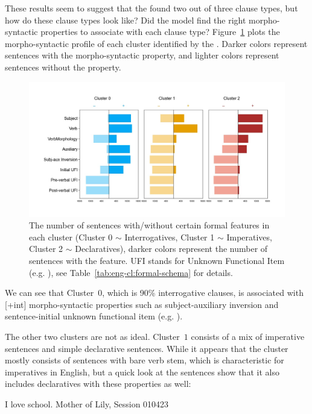 These results seem to suggest that the \dlearnerabbr{} found two out of three clause types, but how do these clause types look like? Did the model find the right morpho-syntactic properties to associate with each clause type? Figure~\ref{fig:baseline-syncluster} plots the morpho-syntactic profile of each cluster identified by the \dlearnerabbr{}. Darker colors represent sentences with the morpho-syntactic property, and lighter colors represent sentences without the property. 

\begin{figure}[H]
    \centering
    \includegraphics[width=1\textwidth]{figures/baseline-syncluster.jpg}
    \caption{The number of sentences with/without certain formal features in each cluster (Cluster 0 $\sim$ Interrogatives, Cluster 1 $\sim$ Imperatives, Cluster 2 $\sim$ Declaratives), darker colors represent the number of sentences with the feature. UFI stands for Unknown Functional Item (e.g. \twh{}), see Table~\ref{tab:eng-cl:formal-schema} for details.}
    \label{fig:baseline-syncluster}
\end{figure}

We can see that Cluster~$0$, which is 90\% interrogative clauses, is associated with [+int] morpho-syntactic properties such as subject-auxiliary inversion and sentence-initial unknown functional item (e.g. \twh{}). 

The other two clusters are not as ideal. Cluster~$1$ consists of a mix of imperative sentences and simple declarative sentences. While it appears that the cluster mostly consists of sentences with bare verb stem, which is characteristic for imperatives in English, but a quick look at the sentences show that it also includes declaratives with these properties as well:

 I love school. \hfill Mother of Lily, Session 010423
\eex

